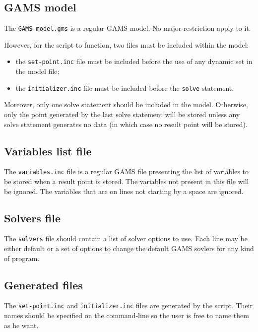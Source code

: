 \documentclass{article}
\begin{document}
\subsection*{GAMS model}

The \texttt{GAMS-model.gms} is a regular GAMS model. No major restriction apply
to it.

However, for the script to function, two files must be included within the
model:
\begin{itemize}
\item the \texttt{set-point.inc} file must be included before the use of any
  dynamic set in the model file;
\item the \texttt{initializer.inc} file must be included before the
  \texttt{solve} statement.
\end{itemize}

Moreover, only one solve statement should be included in the model. Otherwise,
only the point generated by the last solve statement will be stored unless any
solve statement generates no data (in which case no result point will be
stored).

\subsection*{Variables list file}

The \texttt{variables.inc} file is a regular GAMS file presenting the list of
variables to be stored when a result point is stored. The variables not present
in this file will be ignored. The variables that are on lines not starting by a
space are ignored.

\subsection*{Solvers file}

The \texttt{solvers} file should contain a list of solver options to use. Each
line may be either \og default\fg{} or a set of options to change the default
GAMS sovlers for any kind of program.

\subsection*{Generated files}

The \texttt{set-point.inc} and \texttt{initializer.inc} files are generated by
the script. Their names should be specified on the command-line so the user is
free to name them as he want.
\end{document}
